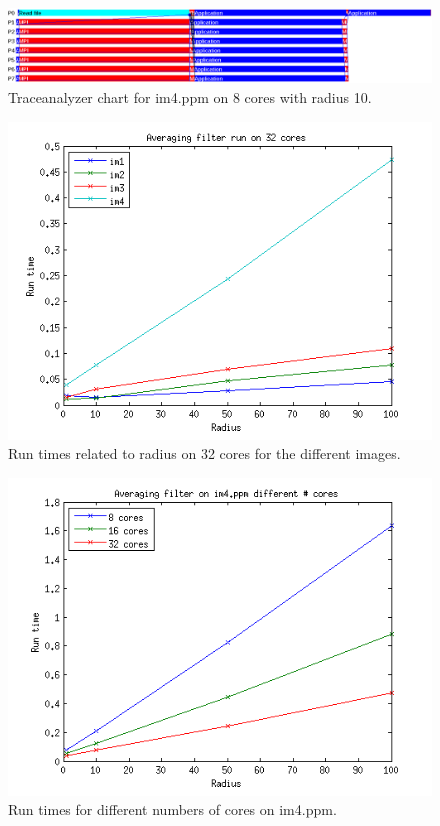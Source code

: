 \documentclass[a4paper,11pt]{article}
\begin{document}
\begin{figure}[!h]
  \caption{Traceanalyzer chart for im4.ppm on 8 cores with radius 10.}
  \label{trace}
  \includegraphics[width=500pt]{../plots/tracechart_r10_im4_8cores.png}
\end{figure}
\begin{figure}[!h]
  \caption{Run times related to radius on 32 cores for the different images.}
  \label{32_cores_runtime}
  \includegraphics[scale=0.9]{../plots/32_cores_runtime_radius.png}
\end{figure}
\begin{figure}[!h]
  \caption{Run times for different numbers of cores on im4.ppm.}
  \label{im4}
  \includegraphics[scale=0.9]{../plots/im4_runtime_radius.png}
\end{figure}
\end{document}
